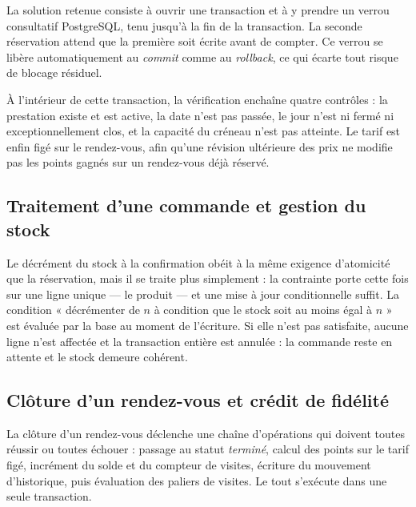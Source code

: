 La solution retenue consiste à ouvrir une transaction et à y prendre un verrou
consultatif PostgreSQL, tenu jusqu'à la fin de la transaction. La seconde
réservation attend que la première soit écrite avant de compter. Ce verrou se
libère automatiquement au \textit{commit} comme au \textit{rollback}, ce qui
écarte tout risque de blocage résiduel.

À l'intérieur de cette transaction, la vérification enchaîne quatre contrôles :
la prestation existe et est active, la date n'est pas passée, le jour n'est ni
fermé ni exceptionnellement clos, et la capacité du créneau n'est pas atteinte.
Le tarif est enfin figé sur le rendez-vous, afin qu'une révision ultérieure des
prix ne modifie pas les points gagnés sur un rendez-vous déjà réservé.

\subsection{Traitement d'une commande et gestion du stock}


Le décrément du stock à la confirmation obéit à la même exigence d'atomicité
que la réservation, mais il se traite plus simplement : la contrainte porte
cette fois sur une ligne unique --- le produit --- et une mise à jour
conditionnelle suffit. La condition « décrémenter de $n$ à condition que le
stock soit au moins égal à $n$ » est évaluée par la base au moment de
l'écriture. Si elle n'est pas satisfaite, aucune ligne n'est affectée et la
transaction entière est annulée : la commande reste en attente et le stock
demeure cohérent.

\subsection{Clôture d'un rendez-vous et crédit de fidélité}


La clôture d'un rendez-vous déclenche une chaîne d'opérations qui doivent
toutes réussir ou toutes échouer : passage au statut \textit{terminé}, calcul
des points sur le tarif figé, incrément du solde et du compteur de visites,
écriture du mouvement d'historique, puis évaluation des paliers de visites. Le
tout s'exécute dans une seule transaction.

